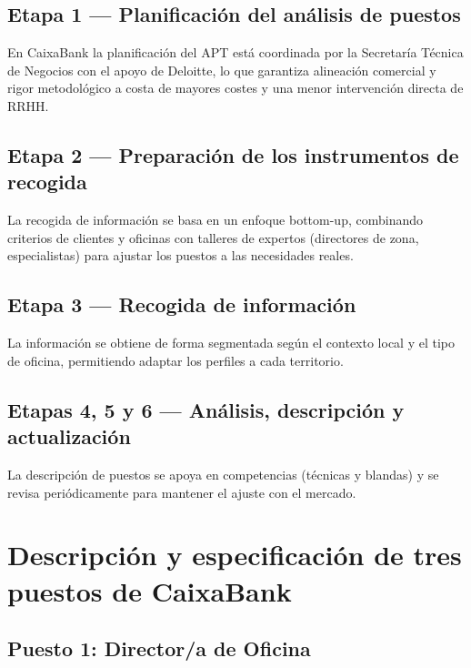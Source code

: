 \subsection{Etapa 1 — Planificación del análisis de puestos}

En CaixaBank la planificación del APT está coordinada por la Secretaría Técnica de Negocios con el apoyo de Deloitte, lo que garantiza alineación comercial y rigor metodológico a costa de mayores costes y una menor intervención directa de RRHH.

\subsection{Etapa 2 — Preparación de los instrumentos de recogida}

La recogida de información se basa en un enfoque bottom-up, combinando criterios de clientes y oficinas con talleres de expertos (directores de zona, especialistas) para ajustar los puestos a las necesidades reales.

\subsection{Etapa 3 — Recogida de información}

La información se obtiene de forma segmentada según el contexto local y el tipo de oficina, permitiendo adaptar los perfiles a cada territorio.

\subsection{Etapas 4, 5 y 6 — Análisis, descripción y actualización}

La descripción de puestos se apoya en competencias (técnicas y blandas) y se revisa periódicamente para mantener el ajuste con el mercado.


\section{Descripción y especificación de tres puestos de CaixaBank}


\subsection{Puesto 1: Director/a de Oficina}

